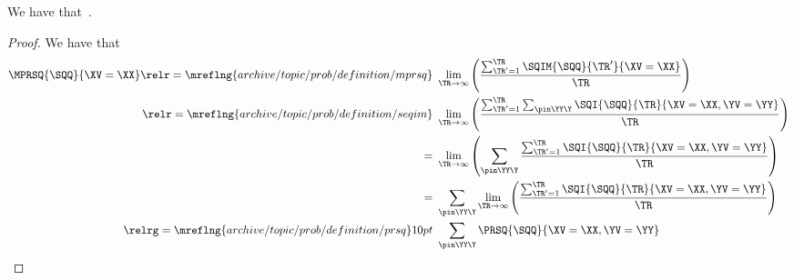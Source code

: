 \begin{proposition}
  We have that\ \mprsqexprprop.%
\end{proposition}

\begin{proof}
  We have that
  \begin{align*}
  \MPRSQ{\SQQ}{\XV = \XX}
                    \relr = {\mreflng{archive/topic/prob/definition/mprsq}} \ & 
                    \lim_{\TR \rightarrow \infty}\left(\frac{\sum_{\TR' = 1}^{\TR}\SQIM{\SQQ}{\TR'}{\XV = \XX}}{\TR}\right)\\
                    \relr = {\mreflng{archive/topic/prob/definition/seqim}} \ & 
                    \lim_{\TR \rightarrow \infty}\left(\frac{\sum_{\TR' = 1}^{\TR}\sum_{\pin\YY\Y} \SQI{\SQQ}{\TR}{\XV = \XX, \YV = \YY}}{\TR}\right)\\
                    = \ & 
                    \lim_{\TR \rightarrow \infty}\left(\sum_{\pin\YY\Y} \frac{\sum_{\TR' = 1}^{\TR}\SQI{\SQQ}{\TR}{\XV = \XX, \YV = \YY}}{\TR}\right)\\
                    = \ & 
                    \sum_{\pin\YY\Y} \lim_{\TR \rightarrow \infty}\left(\frac{\sum_{\TR' = 1}^{\TR}\SQI{\SQQ}{\TR}{\XV = \XX, \YV = \YY}}{\TR}\right)\\
                    \relrg = {\mreflng{archive/topic/prob/definition/prsq}} 10pt \ & 
                    \sum_{\pin\YY\Y}\PRSQ{\SQQ}{\XV = \XX, \YV = \YY}
  \end{align*}
\end{proof}
